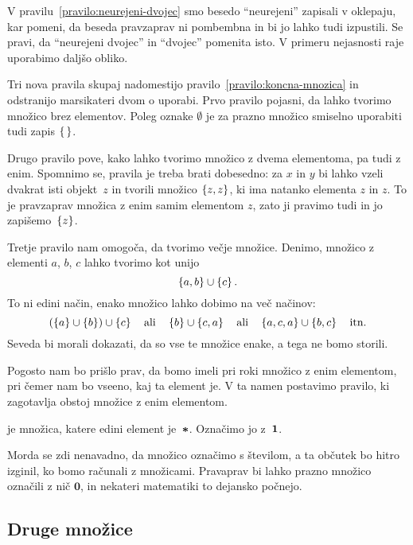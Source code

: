 V pravilu~\ref{pravilo:neurejeni-dvojec} smo besedo ``neurejeni'' zapisali v oklepaju, kar
pomeni, da beseda pravzaprav ni pombembna in bi jo lahko tudi izpustili. Se pravi, da
``neurejeni dvojec'' in ``dvojec'' pomenita isto. V primeru nejasnosti raje uporabimo
daljšo obliko.

Tri nova pravila skupaj nadomestijo pravilo~\ref{pravilo:koncna-mnozica} in odstranijo
marsikateri dvom o uporabi. Prvo pravilo pojasni, da lahko tvorimo množico brez elementov.
Poleg oznake $\emptyset$ je za prazno množico smiselno uporabiti tudi zapis $\set{\,}$.

Drugo pravilo pove, kako lahko tvorimo množico z dvema elementoma, pa tudi z enim.
Spomnimo se, pravila je treba brati dobesedno: za $x$ in $y$ bi lahko vzeli dvakrat isti
objekt~$z$ in tvorili množico $\set{z, z}$, ki ima natanko elementa $z$ in $z$. To je
pravzaprav množica z enim samim elementom $z$, zato ji pravimo tudi  in jo
zapišemo~$\set{z}$.

Tretje pravilo nam omogoča, da tvorimo večje množice. Denimo, množico z elementi $a$, $b$,
$c$ lahko tvorimo kot unijo
%
\begin{equation*}
  \set{a, b} \cup \set{c}.
\end{equation*}
%
To ni edini način, enako množico lahko dobimo na več načinov:
%
\begin{equation*}
  (\set{a} \cup \set{b}) \cup \set{c}
  \quad\text{ali}\quad
  \set{b} \cup \set{c, a}
  \quad\text{ali}\quad
  \set{a,c,a} \cup \set{b,c}
  \quad\text{itn.}
\end{equation*}
%
Seveda bi morali dokazati, da so vse te množice enake, a tega ne bomo storili.

Pogosto nam bo prišlo prav, da bomo imeli pri roki množico z enim elementom, pri čemer nam
bo vseeno, kaj ta element je. V ta namen postavimo pravilo, ki zagotavlja obstoj množice z
enim elementom.

\begin{pravilo}
   je množica, katere edini element je~$\mathord{\boldsymbol{*}}$. Označimo jo z~$\mathtt{\mathbf{1}}$.
\end{pravilo}

Morda se zdi nenavadno, da množico označimo s številom, a ta občutek bo hitro izginil, ko
bomo računali z množicami. Pravaprav bi lahko prazno množico označili z nič $\mathbf{0}$,
in nekateri matematiki to dejansko počnejo.

\subsection{Druge množice}

